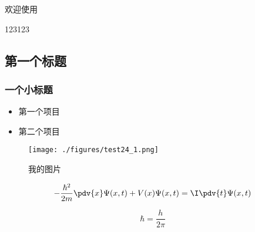 
欢迎使用

123123

\subsection{第一个标题}
\subsubsection{一个小标题}

\begin{itemize}
\item 第一个项目
\item 第二个项目
\end{itemize}

\begin{figure}[ht]
\centering
\texttt{[image: ./figures/test24\_1.png]}
\caption{我的图片} \label{test24_fig1}
\end{figure}

\begin{equation}
-\frac{\hbar^2}{2m} \pdv{x} \Psi(x, t) + V(x) \Psi(x,t) = \I\pdv{t}\Psi(x,t)
\end{equation}

\begin{equation}
\hbar = \frac{h}{2\pi}
\end{equation}
